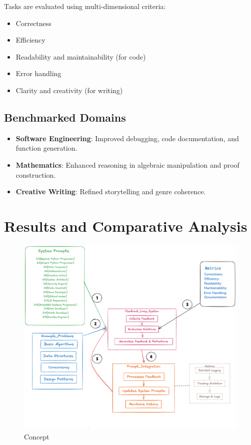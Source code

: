 \documentclass[10pt,a4paper,twocolumn]{article}
\begin{document}
 Tasks are evaluated using multi-dimensional criteria:

\begin{itemize}
    \item Correctness
    \item Efficiency
    \item Readability and maintainability (for code)
    \item Error handling
    \item Clarity and creativity (for writing)



\end{itemize}



\subsection{Benchmarked Domains}



\begin{itemize}
    \item \textbf{Software Engineering}: Improved debugging, code documentation, and function generation.
    \item \textbf{Mathematics}: Enhanced reasoning in algebraic manipulation and proof construction.
    \item \textbf{Creative Writing}: Refined storytelling and genre coherence.
\end{itemize}





\section{{\textbf{Results and Comparative Analysis} } }


\begin{figure}
    \centering
    \includegraphics[width=1\linewidth]{concept.png}
    \caption{Concept}
    \label{concept}
\end{figure}
\end{document}
